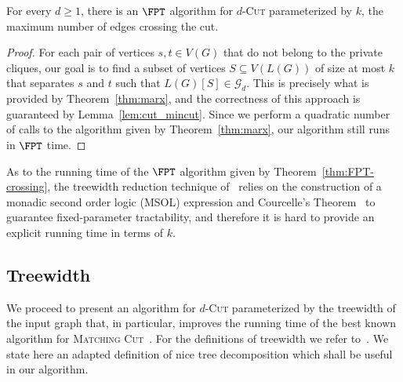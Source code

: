 \documentclass[a4paper,UKenglish,cleveref, autoref]{lipics-v2019}
\newcommand{\pname}[1]{\textsc{#1}}
\begin{document}
\begin{theorem}\label{thm:FPT-crossing}
    For every $d \geq 1$, there is an $\FPT$ algorithm for \pname{$d$-Cut} parameterized by $k$, the maximum number of edges crossing the cut.
\end{theorem}

\begin{proof}
    For each pair of vertices $s,t \in V(G)$ that do not belong to the private cliques, our goal is to find a subset of vertices $S \subseteq V(L(G))$ of size at most $k$ that separates $s$ and $t$ such that $L(G)[S] \in \mathcal{G}_d$.
    This is precisely what is provided by Theorem~\ref{thm:marx}, and the correctness of this approach is guaranteed by Lemma~\ref{lem:cut_mincut}.
    Since we perform a quadratic number of calls to the  algorithm given by Theorem~\ref{thm:marx}, our algorithm still runs in $\FPT$ time.
\end{proof}

As to the running time of the $\FPT$ algorithm given by Theorem~\ref{thm:FPT-crossing}, the treewidth reduction technique of~\cite{marx_treewidth_reduction} relies on the construction of a monadic second order logic (MSOL) expression and Courcelle's Theorem~\cite{courcelle_theorem} to guarantee fixed-parameter tractability, and therefore it is hard to provide an explicit running time in terms of $k$.

\subsection{Treewidth}
\label{thm:algo-tw}

We proceed to present an algorithm for \pname{$d$-Cut} parameterized by the treewidth of the input graph that, in particular, improves the running time of the best known algorithm for \pname{Matching Cut}~\cite{matching_cut_structural}.
For the definitions of treewidth we refer to~\cite{treewidth,CyganFKLMPPS15}.
We state here an adapted definition of nice tree decomposition which shall be useful in our algorithm.


\end{document}
